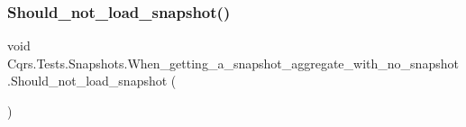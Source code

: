 \subsubsection{\texorpdfstring{Should\+\_\+not\+\_\+load\+\_\+snapshot()}{Should\_not\_load\_snapshot()}}
{\footnotesize\ttfamily void Cqrs.\+Tests.\+Snapshots.\+When\+\_\+getting\+\_\+a\+\_\+snapshot\+\_\+aggregate\+\_\+with\+\_\+no\+\_\+snapshot.\+Should\+\_\+not\+\_\+load\+\_\+snapshot (\begin{DoxyParamCaption}{ }\end{DoxyParamCaption})}

